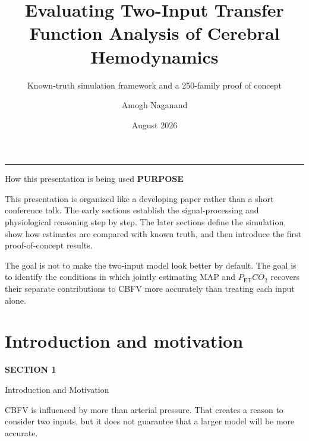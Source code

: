\documentclass[aspectratio=169,11pt]{beamer}
\title{Evaluating Two-Input Transfer Function Analysis of Cerebral Hemodynamics}
\subtitle{Known-truth simulation framework and a 250-family proof of concept}
\author{Amogh Naganand}
\date{August 2026}
\newcommand{\PETCOtwo}{P_{\mathrm{ET}}CO_2}
\newcommand{\sectionlabel}[1]{%
  {\color{Accent}\fontsize{8}{9.5}\selectfont\bfseries\MakeUppercase{#1}}\par\vspace{0.12cm}}
\newcommand{\sectionframe}[3]{%
  \begin{frame}[plain]
    \vspace{0.7cm}
    {\color{Accent}\fontsize{10}{12}\selectfont\bfseries SECTION #1}\par\vspace{0.45cm}
    {\color{Ink}\fontsize{24.5}{28}\selectfont #2}\par\vspace{0.55cm}
    {\color{Body}\fontsize{14.5}{19}\selectfont #3}
  \end{frame}}
\begin{document}

\begin{frame}[plain]
  \titlepage
  \vspace{-0.35cm}
  \begin{center}
    {\color{Accent}\rule{0.28\textwidth}{0.8pt}}
  \end{center}
\end{frame}

\begin{frame}{How this presentation is being used}
\sectionlabel{Purpose}
This presentation is organized like a developing paper rather than a short
conference talk. The early sections establish the signal-processing and
physiological reasoning step by step. The later sections define the simulation,
show how estimates are compared with known truth, and then introduce the first
proof-of-concept results.

\vspace{0.45cm}
The goal is not to make the two-input model look better by default. The goal is
to identify the conditions in which jointly estimating MAP and $\PETCOtwo$
recovers their separate contributions to CBFV more accurately than treating each
input alone.
\end{frame}


\section{Introduction and motivation}
\sectionframe{1}{Introduction and Motivation}{%
CBFV is influenced by more than arterial pressure. That creates a reason to
consider two inputs, but it does not guarantee that a larger model will be more
accurate.}
\end{document}
